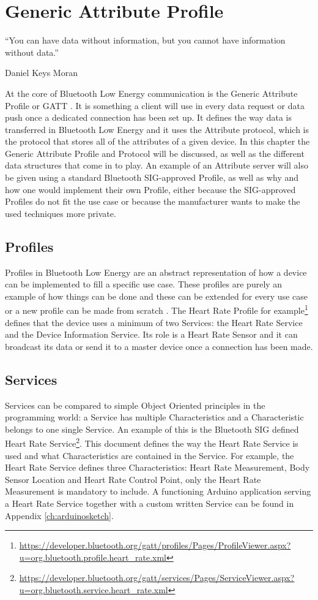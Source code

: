 \documentclass[pdftex,a4paper,12pt,twoside]{report}
\begin{document}
\chapter{Generic Attribute Profile}
\label{ch:gatt}
\epigraph{``You can have data without information, but you cannot have information without data.''}{Daniel Keys Moran}
At the core of Bluetooth Low Energy communication is the Generic Attribute Profile or GATT \citep{Townsend2014}. It is something a client will use in every data request or data push once a dedicated connection has been set up. It defines the way data is transferred in Bluetooth Low Energy and it uses the Attribute protocol, which is the protocol that stores all of the attributes of a given device. In this chapter the Generic Attribute Profile and Protocol will be discussed, as well as the different data structures that come in to play. An example of an Attribute server will also be given using a standard Bluetooth SIG-approved Profile, as well as why and how one would implement their own Profile, either because the SIG-approved Profiles do not fit the use case or because the manufacturer wants to make the used techniques more private.

\section{Profiles}
\label{sec:profiles}
Profiles in Bluetooth Low Energy are an abstract representation of how a device can be implemented to fill a specific use case. These profiles are purely an example of how things can be done and these can be extended for every use case or a new profile can be made from scratch \citep{Townsend2014}. The Heart Rate Profile for example\footnote{\url{https://developer.bluetooth.org/gatt/profiles/Pages/ProfileViewer.aspx?u=org.bluetooth.profile.heart_rate.xml}} defines that the device uses a minimum of two Services: the Heart Rate Service and the Device Information Service. Its role is a Heart Rate Sensor and it can broadcast its data or send it to a master device once a connection has been made.

\section{Services}
\label{sec:services}
Services can be compared to simple Object Oriented principles in the programming world: a Service has multiple Characteristics and a Characteristic belongs to one single Service. An example of this is the Bluetooth SIG defined Heart Rate Service\footnote{\url{https://developer.bluetooth.org/gatt/services/Pages/ServiceViewer.aspx?u=org.bluetooth.service.heart_rate.xml}}. This document defines the way the Heart Rate Service is used and what Characteristics are contained in the Service. For example, the Heart Rate Service defines three Characteristics: Heart Rate Measurement, Body Sensor Location and Heart Rate Control Point, only the Heart Rate Measurement is mandatory to include. A functioning Arduino application serving a Heart Rate Service together with a custom written Service can be found in Appendix \ref{ch:arduinosketch}.
\end{document}
